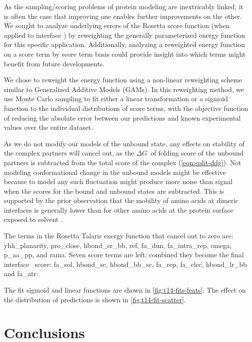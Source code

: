 As the sampling/scoring problems of protein modeling are inextricably linked, it is often the case that improving one enables further improvements on the other.
We sought to analyze underlying errors of the Rosetta score function (when applied to interface \ddg) by reweighting the generally parameterized energy function for this specific application.
Additionally, analyzing a reweighted energy function on a score term by score term basis could provide insight into which terms might benefit from future developments.

We chose to reweight the energy function using a non-linear reweighting scheme similar to Generalized Additive Models (GAMs)\cite{wood_fast_2011}.
In this reweighting method, we use Monte Carlo sampling to fit either a linear transformation or a sigmoid function to the individual distributions of score terms, with the objective function of reducing the absolute error between our predictions and known experimental values over the entire dataset.

As we do not modify our models of the unbound state, any effects on stability of the complex partners will cancel out, as the $\Delta G$\ of folding score of the unbound partners is subtracted from the total score of the complex (\cref{eqn:split-ddg}).
Not modeling conformational change in the unbound models might be effective because to model any such fluctuation might produce more noise than signal when the scores for the bound and unbound states are subtracted.
This is supported by the prior observation that the mobility of amino acids at dimeric interfaces is generally lower than for other amino acids at the protein surface exposed to solvent \cite{zen_comparing_2010}.

The terms in the Rosetta Talaris energy function that cancel out to zero are: yhh\_planarity, pro\_close, hbond\_sr\_bb, ref, fa\_dun, fa\_intra\_rep, omega, p\_aa\_pp, and rama.
Seven score terms are left; combined they become the final interface \ddg\ score: fa\_sol, hbond\_sc, hbond\_bb\_sc, fa\_rep, fa\_elec, hbond\_lr\_bb and fa\_atr.

The fit sigmoid and linear functions are shown in \cref{fig:t14-fits-feats}.
The effect on the distribution of predictions is shown in \cref{fig:t14-fit-scatter}.

\section{Conclusions}

